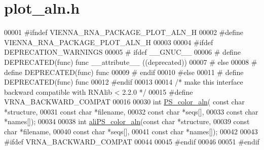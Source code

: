 \hypertarget{plot__aln_8h_source}{}\section{plot\+\_\+aln.\+h}
\label{plot__aln_8h_source}

\begin{DoxyCode}
00001 \textcolor{preprocessor}{#ifndef VIENNA\_RNA\_PACKAGE\_PLOT\_ALN\_H}
00002 \textcolor{preprocessor}{#define VIENNA\_RNA\_PACKAGE\_PLOT\_ALN\_H}
00003 
00004 \textcolor{preprocessor}{#ifdef DEPRECATION\_WARNINGS}
00005 \textcolor{preprocessor}{# ifdef \_\_GNUC\_\_}
00006 \textcolor{preprocessor}{#  define DEPRECATED(func) func \_\_attribute\_\_ ((deprecated))}
00007 \textcolor{preprocessor}{# else}
00008 \textcolor{preprocessor}{#  define DEPRECATED(func) func}
00009 \textcolor{preprocessor}{# endif}
00010 \textcolor{preprocessor}{#else}
00011 \textcolor{preprocessor}{# define DEPRECATED(func) func}
00012 \textcolor{preprocessor}{#endif}
00013 
00014 \textcolor{comment}{/* make this interface backward compatible with RNAlib < 2.2.0 */}
00015 \textcolor{preprocessor}{#define VRNA\_BACKWARD\_COMPAT}
00016 
00030 \textcolor{keywordtype}{int} \hyperlink{group__plotting__utils_ga821802c3685e37e15182341f6217470d}{PS\_color\_aln}( \textcolor{keyword}{const} \textcolor{keywordtype}{char} *structure,
00031                   \textcolor{keyword}{const} \textcolor{keywordtype}{char} *filename,
00032                   \textcolor{keyword}{const} \textcolor{keywordtype}{char} *seqs[],
00033                   \textcolor{keyword}{const} \textcolor{keywordtype}{char} *names[]);
00034 
00038 \textcolor{keywordtype}{int} \hyperlink{group__plotting__utils_gaab48d4dac655d688abe921389ac2847c}{aliPS\_color\_aln}(\textcolor{keyword}{const} \textcolor{keywordtype}{char} *structure,
00039                     \textcolor{keyword}{const} \textcolor{keywordtype}{char} *filename, 
00040                     \textcolor{keyword}{const} \textcolor{keywordtype}{char} *seqs[],
00041                     \textcolor{keyword}{const} \textcolor{keywordtype}{char} *names[]); 
00042 
00043 \textcolor{preprocessor}{#ifdef VRNA\_BACKWARD\_COMPAT}
00044 
00045 \textcolor{preprocessor}{#endif}
00046 
00051 \textcolor{preprocessor}{#endif}
\end{DoxyCode}
